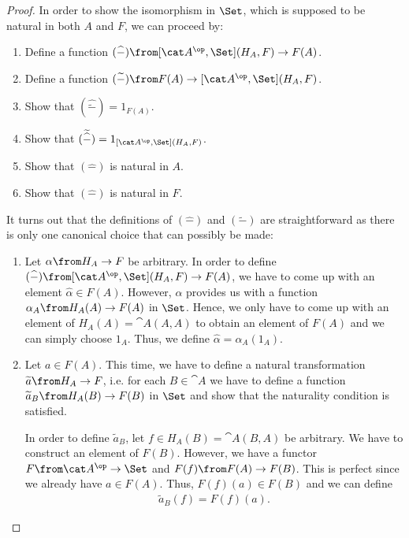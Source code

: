 \documentclass{article}
\theoremstyle{definition}
\numberwithin{equation}{section}
\begin{document}
\begin{proof}
  In order to show the isomorphism in $\Set$, which is supposed to be natural in both $A$ and $F$, we can proceed by:
  \begin{enumerate}
  \item Define a function $(\widehat{-})\from[\cat A^\op,\Set](H_A,F)\to F(A)$.
  \item Define a function $(\widetilde{-})\from F(A)\to[\cat A^\op,\Set](H_A,F)$.
  \item Show that $(\widehat{\widetilde{-}})=1_{F(A)}$.
  \item Show that $(\widetilde{\widehat{-}})=1_{[\cat A^\op,\Set](H_A,F)}$.
  \item Show that $(\widehat{-})$ is natural in $A$.
  \item Show that $(\widehat{-})$ is natural in $F$.
  \end{enumerate}
  It turns out that the definitions of $(\widehat{-})$ and $(\widetilde{-})$ are straightforward as there is only one canonical choice that can possibly be made:
  \begin{enumerate}
  \item Let $\alpha\from H_A\to F$ be arbitrary. In order to define $(\widehat{-})\from[\cat A^\op,\Set](H_A,F)\to F(A)$, we have to come up with an element $\widehat\alpha\in F(A)$. However, $\alpha$ provides us with a function $\alpha_A\from H_A(A)\to F(A)$ in $\Set$. Hence, we only have to come up with an element of $H_A(A)=\cat A(A,A)$ to obtain an element of $F(A)$ and we can simply choose $1_A$. Thus, we define $\widehat\alpha=\alpha_A(1_A)$.
  \item Let $a\in F(A)$. This time, we have to define a natural transformation $\widetilde a\from H_A\to F$, i.e. for each $B\in\cat A$ we have to define a function $\widetilde a_B\from H_A(B)\to F(B)$ in $\Set$ and show that the naturality condition is satisfied.

    In order to define $\tilde a_B$, let $f\in H_A(B)=\cat A(B,A)$ be arbitrary. We have to construct an element of $F(B)$. However, we have a functor $F\from\cat A^\op\to\Set$ and $F(f)\from F(A)\to F(B)$. This is perfect since we already have $a\in F(A)$. Thus, $F(f)(a)\in F(B)$ and we can define 
    \begin{align*}
      \widetilde a_B(f)=F(f)(a).
    \end{align*}


\end{enumerate}
\end{proof}
\end{document}
